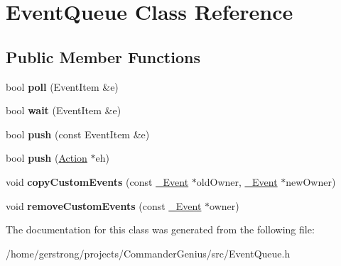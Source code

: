 \hypertarget{class_event_queue}{
\section{EventQueue Class Reference}
\label{class_event_queue}
}
\subsection*{Public Member Functions}
\begin{DoxyCompactItemize}
\item 
\hypertarget{class_event_queue_a5e60c8592c6769bd26475a80f08904b5}{
bool {\bfseries poll} (EventItem \&e)}
\label{class_event_queue_a5e60c8592c6769bd26475a80f08904b5}

\item 
\hypertarget{class_event_queue_a6cbce3ed078b6a87692c96ca68c9e8ab}{
bool {\bfseries wait} (EventItem \&e)}
\label{class_event_queue_a6cbce3ed078b6a87692c96ca68c9e8ab}

\item 
\hypertarget{class_event_queue_a9872921bca9664df4cdb965ff4947afc}{
bool {\bfseries push} (const EventItem \&e)}
\label{class_event_queue_a9872921bca9664df4cdb965ff4947afc}

\item 
\hypertarget{class_event_queue_a2214e21a35d7ac5d913d8c32dc2e3bfb}{
bool {\bfseries push} (\hyperlink{struct_action}{Action} $\ast$eh)}
\label{class_event_queue_a2214e21a35d7ac5d913d8c32dc2e3bfb}

\item 
\hypertarget{class_event_queue_ac3fbd4cc6ea56133b9838ae3c11ca058}{
void {\bfseries copyCustomEvents} (const \hyperlink{class___event}{\_\-Event} $\ast$oldOwner, \hyperlink{class___event}{\_\-Event} $\ast$newOwner)}
\label{class_event_queue_ac3fbd4cc6ea56133b9838ae3c11ca058}

\item 
\hypertarget{class_event_queue_a9af5fa83d59a48e40d02cf802041aff0}{
void {\bfseries removeCustomEvents} (const \hyperlink{class___event}{\_\-Event} $\ast$owner)}
\label{class_event_queue_a9af5fa83d59a48e40d02cf802041aff0}

\end{DoxyCompactItemize}


The documentation for this class was generated from the following file:\begin{DoxyCompactItemize}
\item 
/home/gerstrong/projects/CommanderGenius/src/EventQueue.h\end{DoxyCompactItemize}
